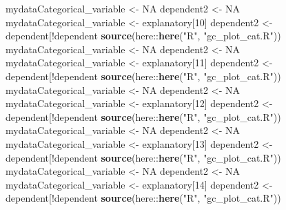 \documentclass[
]{article}
\newenvironment{Shaded}{\begin{snugshade}}{\end{snugshade}}
\newcommand{\DecValTok}[1]{\textcolor[rgb]{0.69,0.50,0.00}{#1}}
\newcommand{\KeywordTok}[1]{\textcolor[rgb]{0.12,0.11,0.11}{\textbf{#1}}}
\newcommand{\NormalTok}[1]{\textcolor[rgb]{0.12,0.11,0.11}{#1}}
\newcommand{\OperatorTok}[1]{\textcolor[rgb]{0.12,0.11,0.11}{#1}}
\newcommand{\OtherTok}[1]{\textcolor[rgb]{0.00,0.43,0.16}{#1}}
\newcommand{\StringTok}[1]{\textcolor[rgb]{0.75,0.01,0.01}{#1}}
\begin{document}
\begin{Shaded}
\begin{Highlighting}[]
{{{{{{{{{{{{{{{{{{{{{{{{{{{{{{{{{{{{{{{{{{{{{{{{{{{{{{{{{{{{{{{{{{{{{{{{{{{{{{{{{{{{{{{{{{{{{{{{{{{{{{{{{{{{{{{{{{{{{{{{{{{{{{{{{{{{{{{{{{{{{{{{{{{{{{{{{{{{{{{{{{{{{{{{{{{{{{{{{{{{{{{{{{{{{{{{{{{{{{{{{{{{{{{{{{{{{{{{{{{{{{{{{{{{{{{{{{{{\NormalTok{mydataCategorical_variable <-}\StringTok{ }\OtherTok{NA}
\NormalTok{dependent2 <-}\StringTok{ }\OtherTok{NA}
\NormalTok{mydataCategorical_variable <-}\StringTok{ }\NormalTok{explanatory[}\DecValTok{10}\NormalTok{]}
\NormalTok{dependent2 <-}\StringTok{ }\NormalTok{dependent[}\OperatorTok{!}\NormalTok{dependent }\OperatorTok{%in%}\StringTok{ }\NormalTok{mydataCategorical_variable]}
\KeywordTok{source}\NormalTok{(here}\OperatorTok{::}\KeywordTok{here}\NormalTok{(}\StringTok{"R"}\NormalTok{, }\StringTok{"gc_plot_cat.R"}\NormalTok{))}
\NormalTok{mydataCategorical_variable <-}\StringTok{ }\OtherTok{NA}
\NormalTok{dependent2 <-}\StringTok{ }\OtherTok{NA}
\NormalTok{mydataCategorical_variable <-}\StringTok{ }\NormalTok{explanatory[}\DecValTok{11}\NormalTok{]}
\NormalTok{dependent2 <-}\StringTok{ }\NormalTok{dependent[}\OperatorTok{!}\NormalTok{dependent }\OperatorTok{%in%}\StringTok{ }\NormalTok{mydataCategorical_variable]}
\KeywordTok{source}\NormalTok{(here}\OperatorTok{::}\KeywordTok{here}\NormalTok{(}\StringTok{"R"}\NormalTok{, }\StringTok{"gc_plot_cat.R"}\NormalTok{))}
\NormalTok{mydataCategorical_variable <-}\StringTok{ }\OtherTok{NA}
\NormalTok{dependent2 <-}\StringTok{ }\OtherTok{NA}
\NormalTok{mydataCategorical_variable <-}\StringTok{ }\NormalTok{explanatory[}\DecValTok{12}\NormalTok{]}
\NormalTok{dependent2 <-}\StringTok{ }\NormalTok{dependent[}\OperatorTok{!}\NormalTok{dependent }\OperatorTok{%in%}\StringTok{ }\NormalTok{mydataCategorical_variable]}
\KeywordTok{source}\NormalTok{(here}\OperatorTok{::}\KeywordTok{here}\NormalTok{(}\StringTok{"R"}\NormalTok{, }\StringTok{"gc_plot_cat.R"}\NormalTok{))}
\NormalTok{mydataCategorical_variable <-}\StringTok{ }\OtherTok{NA}
\NormalTok{dependent2 <-}\StringTok{ }\OtherTok{NA}
\NormalTok{mydataCategorical_variable <-}\StringTok{ }\NormalTok{explanatory[}\DecValTok{13}\NormalTok{]}
\NormalTok{dependent2 <-}\StringTok{ }\NormalTok{dependent[}\OperatorTok{!}\NormalTok{dependent }\OperatorTok{%in%}\StringTok{ }\NormalTok{mydataCategorical_variable]}
\KeywordTok{source}\NormalTok{(here}\OperatorTok{::}\KeywordTok{here}\NormalTok{(}\StringTok{"R"}\NormalTok{, }\StringTok{"gc_plot_cat.R"}\NormalTok{))}
\NormalTok{mydataCategorical_variable <-}\StringTok{ }\OtherTok{NA}
\NormalTok{dependent2 <-}\StringTok{ }\OtherTok{NA}
\NormalTok{mydataCategorical_variable <-}\StringTok{ }\NormalTok{explanatory[}\DecValTok{14}\NormalTok{]}
\NormalTok{dependent2 <-}\StringTok{ }\NormalTok{dependent[}\OperatorTok{!}\NormalTok{dependent }\OperatorTok{%in%}\StringTok{ }\NormalTok{mydataCategorical_variable]}
\KeywordTok{source}\NormalTok{(here}\OperatorTok{::}\KeywordTok{here}\NormalTok{(}\StringTok{"R"}\NormalTok{, }\StringTok{"gc_plot_cat.R"}\NormalTok{))}
}}}}}}}}}}}}}}}}}}}}}}}}}}}}}}}}}}}}}}}}}}}}}}}}}}}}}}}}}}}}}}}}}}}}}}}}}}}}}}}}}}}}}}}}}}}}}}}}}}}}}}}}}}}}}}}}}}}}}}}}}}}}}}}}}}}}}}}}}}}}}}}}}}}}}}}}}}}}}}}}}}}}}}}}}}}}}}}}}}}}}}}}}}}}}}}}}}}}}}}}}}}}}}}}}}}}}}}}}}}}}}}}}}}}}}}}}}}}}}}}}
\end{Highlighting}
\end{Shaded}
\end{document}
